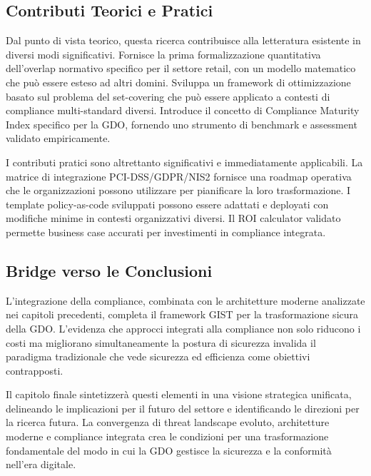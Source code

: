 \subsection{Contributi Teorici e Pratici}

Dal punto di vista teorico, questa ricerca contribuisce alla letteratura esistente in diversi modi significativi. Fornisce la prima formalizzazione quantitativa dell'overlap normativo specifico per il settore retail, con un modello matematico che può essere esteso ad altri domini. Sviluppa un framework di ottimizzazione basato sul problema del set-covering che può essere applicato a contesti di compliance multi-standard diversi. Introduce il concetto di Compliance Maturity Index specifico per la GDO, fornendo uno strumento di benchmark e assessment validato empiricamente.

I contributi pratici sono altrettanto significativi e immediatamente applicabili. La matrice di integrazione PCI-DSS/GDPR/NIS2 fornisce una roadmap operativa che le organizzazioni possono utilizzare per pianificare la loro trasformazione. I template policy-as-code sviluppati possono essere adattati e deployati con modifiche minime in contesti organizzativi diversi. Il ROI calculator validato permette business case accurati per investimenti in compliance integrata.

\subsection{Bridge verso le Conclusioni}

L'integrazione della compliance, combinata con le architetture moderne analizzate nei capitoli precedenti, completa il framework GIST per la trasformazione sicura della GDO. L'evidenza che approcci integrati alla compliance non solo riducono i costi ma migliorano simultaneamente la postura di sicurezza invalida il paradigma tradizionale che vede sicurezza ed efficienza come obiettivi contrapposti.

Il capitolo finale sintetizzerà questi elementi in una visione strategica unificata, delineando le implicazioni per il futuro del settore e identificando le direzioni per la ricerca futura. La convergenza di threat landscape evoluto, architetture moderne e compliance integrata crea le condizioni per una trasformazione fondamentale del modo in cui la GDO gestisce la sicurezza e la conformità nell'era digitale.


